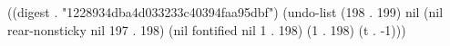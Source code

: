 
((digest . "1228934dba4d033233c40394faa95dbf") (undo-list (198 . 199) nil (nil rear-nonsticky nil 197 . 198) (nil fontified nil 1 . 198) (1 . 198) (t . -1)))
